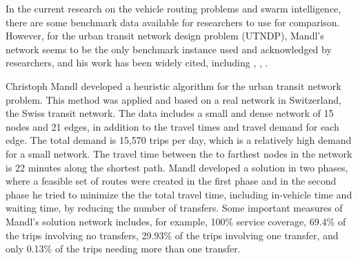 

In the current research on the vehicle routing problems and swarm intelligence, there are some benchmark data available for researchers to use for comparison. However, for the urban transit network design problem (UTNDP), Mandl's network seems to be the only benchmark instance used and acknowledged by researchers, and his work has been widely cited, including \citep{fan09}, \citep{kechagiopoulos14}, \citep{nikolic14}. %

Christoph Mandl \citep{mandl79} developed a heuristic algorithm for the urban transit network problem. This method was applied and based on a real network in Switzerland, the Swiss transit network\citep{mandl80}. The data includes a small and dense network of 15 nodes and 21 edges, in addition to the travel times and travel demand for each edge. The total demand is 15,570 trips per day, which is a relatively high demand for a small network. The travel time between the to farthest nodes in the network is 22 minutes along the shortest path. Mandl developed a solution in two phases, where a feasible set of routes were created in the first phase and in the second phase he tried to minimize the the total travel time, including in-vehicle time and waiting time, by reducing the number of transfers. Some important measures of Mandl's solution network includes, for example, 100\% service coverage, 69.4\% of the trips involving no transfers, 29.93\% of the trips involving one transfer, and only 0.13\% of the trips needing more than one transfer. %

